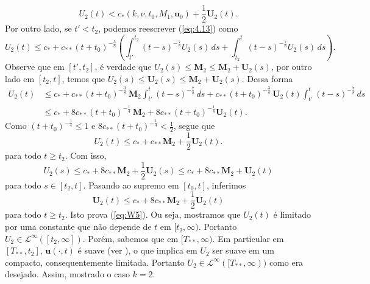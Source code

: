\documentclass[a4paper, 11pt]{book}
\theoremstyle{definition}
\newcommand{\bu}{\mathbf{u}}
\newcommand{\cL}{\mathcal{L}}
\begin{document}
\begin{prf}
    \[
        U_2(t) < c_*(k,\nu,t_0,M_1, \bu_0) + \frac{1}{2} \mathbf{U}_2(t).
    \]
    Por outro lado, se $t'< t_2$, podemos reescrever (\ref{eq:4.13}) como
    \[
        U_2(t) \leqslant c_* + c_{**} (t + t_0)^{-\frac{3}{8}} \left( \int_{t'}^{t_2} (t - s)^{-\frac{7}{8}} U_2(s) \,ds + \int_{t_2}^t (t - s)^{-\frac{7}{8}}U_2(s) \,ds \right).
    \]
    Observe que em $[t',t_2]$, é verdade que $U_2(s) \leqslant \mathbf{M}_2 \leqslant \mathbf{M}_2 + \mathbf{U}_2(s)$, por outro lado em $[t_2, t]$, temos que $U_2(s) \leqslant \mathbf{U}_2(s) \leqslant \mathbf{M}_2 + \mathbf{U}_2(s)$.
    Dessa forma
    \[
        \begin{aligned}
            U_2(t) &\leqslant c_* + c_{**} (t + t_0)^{-\frac{3}{8}} \, \mathbf{M}_2\int_{t'}^{t} (t - s)^{-\frac{7}{8}}\,ds + c_{**} (t + t_0)^{-\frac{3}{8}}\,\mathbf{U}_2(t)\int_{t'}^{t} (t - s)^{-\frac{7}{8}}\,ds\\
            &\leqslant c_* + 8c_{**} (t+ t_0)^{-\frac{1}{4}}\, \mathbf{M}_2 + 8 c_{**}(t+t_0)^{-\frac{1}{4}}\mathbf{U}_2(t).
        \end{aligned}
    \]
    Como $(t + t_0)^{-\frac{1}{4}} \leqslant 1$ e $8c_{**} (t+t_0)^{-\frac{1}{4}} < \frac{1}{2}$, segue que
    \[
        U_2(t) \leqslant c_* + c_{**} \mathbf{M}_2 + \frac{1}{2} \mathbf{U}_2(t).
    \]
    para todo $t \geqslant t_2$.
    Com isso,
    \[
        U_2(s) \leqslant c_* + 8c_{**} \mathbf{M}_2 + \frac{1}{2} \mathbf{U}_2(s) \leqslant c_* + 8c_{**}\mathbf{M}_2 + \mathbf{U}_2(t)
    \]
    para todo $s \in [t_2,t]$.
    Pasando ao supremo em $[t_0,t]$, inferimos
    \[
        \mathbf{U}_2(t) \leqslant c_* + 8c_{**} \mathbf{M}_2 + \frac{1}{2} \mathbf{U}_2(t)
    \]
    para todo $t \geqslant t_2$. Isto prova (\ref{eq:W5}).
    Ou seja, mostramos que $U_2(t)$ é limitado por uma constante que não depende de $t$ em $[t_2, \infty)$. Portanto $U_2 \in \cL^\infty([t_2, \infty])$. Porém, sabemos que em $[T_{**}, \infty)$. Em particular em $[T_{**}, t_2]$, $\bu(\cdot,t)$ é suave (ver \cite{leray-fluid}), o que implica em $U_2$ ser suave em um compacto, consequentemente limitada.
    Portanto $U_2 \in \cL^\infty([T_{**},\infty))$ como era desejado. Assim, mostrado o caso $k = 2$.


\end{prf}
\end{document}
